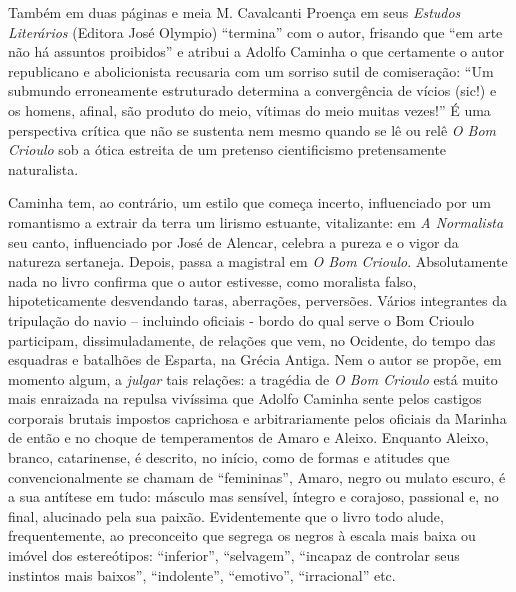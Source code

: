 \documentclass[
  letterpaper,
  DIV=11,
  numbers=noendperiod]{scrreprt}
\begin{document}
Também em duas páginas e meia M. Cavalcanti Proença em seus
\emph{Estudos Literários} (Editora José Olympio) ``termina'' com o
autor, frisando que ``em arte não há assuntos proibidos'' e atribui a
Adolfo Caminha o que certamente o autor republicano e abolicionista
recusaria com um sorriso sutil de comiseração: ``Um submundo
erroneamente estruturado determina a convergência de vícios (sic!) e os
homens, afinal, são produto do meio, vítimas do meio muitas vezes!'' É
uma perspectiva crítica que não se sustenta nem mesmo quando se lê ou
relê \emph{O Bom Crioulo} sob a ótica estreita de um pretenso
cientificismo pretensamente naturalista.

Caminha tem, ao contrário, um estilo que começa incerto, influenciado
por um romantismo a extrair da terra um lirismo estuante, vitalizante:
em \emph{A Normalista} seu canto, influenciado por José de Alencar,
celebra a pureza e o vigor da natureza sertaneja. Depois, passa a
magistral em \emph{O Bom Crioulo}. Absolutamente nada no livro confirma
que o autor estivesse, como moralista falso, hipoteticamente desvendando
taras, aberrações, perversões. Vários integrantes da tripulação do navio
-- incluindo oficiais - bordo do qual serve o Bom Crioulo participam,
dissimuladamente, de relações que vem, no Ocidente, do tempo das
esquadras e batalhões de Esparta, na Grécia Antiga. Nem o autor se
propõe, em momento algum, a \emph{julgar} tais relações: a tragédia de
\emph{O Bom Crioulo} está muito mais enraizada na repulsa vivíssima que
Adolfo Caminha sente pelos castigos corporais brutais impostos
caprichosa e arbitrariamente pelos oficiais da Marinha de então e no
choque de temperamentos de Amaro e Aleixo. Enquanto Aleixo, branco,
catarinense, é descrito, no início, como de formas e atitudes que
convencionalmente se chamam de ``femininas'', Amaro, negro ou mulato
escuro, é a sua antítese em tudo: másculo mas sensível, íntegro e
corajoso, passional e, no final, alucinado pela sua paixão.
Evidentemente que o livro todo alude, frequentemente, ao preconceito que
segrega os negros à escala mais baixa ou imóvel dos estereótipos:
``inferior'', ``selvagem'', ``incapaz de controlar seus instintos mais
baixos'', ``indolente'', ``emotivo'', ``irracional'' etc.
\end{document}
